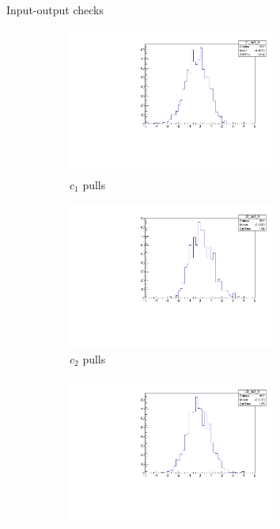 \documentclass{beamer}
\begin{document}
\begin{frame}{Input-output checks}
  \begin{figure}
    \centering
    \begin{subfigure}{0.5\textwidth}
      \centering
      \includegraphics[width=0.75\textwidth,trim={0 0 0 0},clip=true]{Plots/c1_ToyFits_pull.pdf}
      \caption{$c_1$ pulls}
    \end{subfigure}%
    \begin{subfigure}{0.5\textwidth}
      \centering
      \includegraphics[width=0.75\textwidth,trim={0 0 0 0},clip=true]{Plots/c2_ToyFits_pull.pdf}
      \caption{$c_2$ pulls}
    \end{subfigure}
    \begin{subfigure}{0.5\textwidth}
      \centering
      \includegraphics[width=0.75\textwidth,trim={0 0 0 0},clip=true]{Plots/c3_ToyFits_pull.pdf}

\end{subfigure}
\end{figure}
\end{frame}
\end{document}
